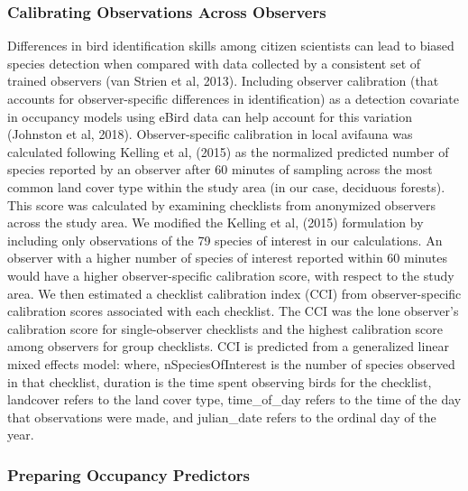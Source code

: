 \subsubsection*{Calibrating Observations Across Observers}

Differences in bird identification skills among citizen scientists can lead to biased species detection when compared with data collected by a consistent set of trained observers (van Strien et al, 2013).
Including observer calibration (that accounts for observer-specific differences in identification) as a detection covariate in occupancy models using eBird data can help account for this variation (Johnston et al, 2018).
Observer-specific calibration in local avifauna was calculated following Kelling et al, (2015) as the normalized predicted number of species reported by an observer after 60 minutes of sampling across the most common land cover type within the study area (in our case, deciduous forests).
This score was calculated by examining checklists from anonymized observers across the study area.
We modified the Kelling et al, (2015) formulation by including only observations of the 79 species of interest in our calculations.
An observer with a higher number of species of interest reported within 60 minutes would have a higher observer-specific calibration score, with respect to the study area.
We then estimated a checklist calibration index (CCI) from observer-specific calibration scores associated with each checklist.
The CCI was the lone observer's calibration score for single-observer checklists and the highest calibration score among observers for group checklists.
CCI is predicted from a generalized linear mixed effects model:
where, nSpeciesOfInterest is the number of species observed in that checklist, duration is the time spent observing birds for the checklist, landcover refers to the land cover type, time\_of\_day refers to the time of the day that observations were made, and julian\_date refers to the ordinal day of the year.

\subsubsection*{Preparing Occupancy Predictors}

